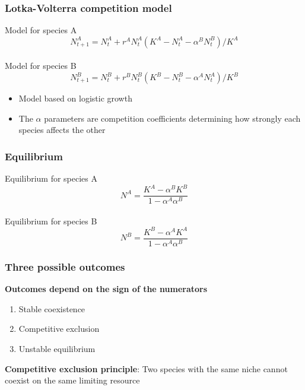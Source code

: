 \documentclass[color=usenames,dvipsnames]{beamer}\usepackage[]{graphicx}\usepackage[]{color}
\begin{document}
\begin{frame}
  \frametitle{Lotka-Volterra competition model}
  \Large
  Model for species A
  \[
    N^A_{t+1} = N^A_t + r^A N^A_t(K^A - N^A_t - \alpha^B N^B_t) / K^A
  \] \\
  \vfill %
  \pause
  Model for species B
  \[
    N^B_{t+1} = N^B_t + r^B N^B_t(K^B - N^B_t - \alpha^A N^A_t) / K^B
  \]
  \pause
  \vfill
  \normalsize
  \begin{itemize}
  \item Model based on logistic growth
  \item The $\alpha$ parameters are competition coefficients
    determining how strongly each species affects the other
  \end{itemize}
\end{frame}



\begin{frame}
  \frametitle{Equilibrium}
  \Large
  Equilibrium for species A
  \[
    N^A = \frac{K^A - \alpha^B K^B}{1 - \alpha^A \alpha^B}
  \] \\
  \vspace{1cm}
  \pause
  Equilibrium for species B
  \[
    N^B = \frac{K^B - \alpha^A K^A}{1 - \alpha^A \alpha^B}
  \]
\end{frame}


\begin{frame}
  \frametitle{Three possible outcomes}
  \large
  {\bf Outcomes depend on the sign of the numerators}
  \begin{enumerate}[(1)]
    \item Stable coexistence
    \item Competitive exclusion
    \item Unstable equilibrium
  \end{enumerate}
  \pause
  \vfill
    \large %
    {\bf Competitive exclusion principle}:
    Two species with the same niche cannot coexist on the same limiting resource
\end{frame}
\end{document}
